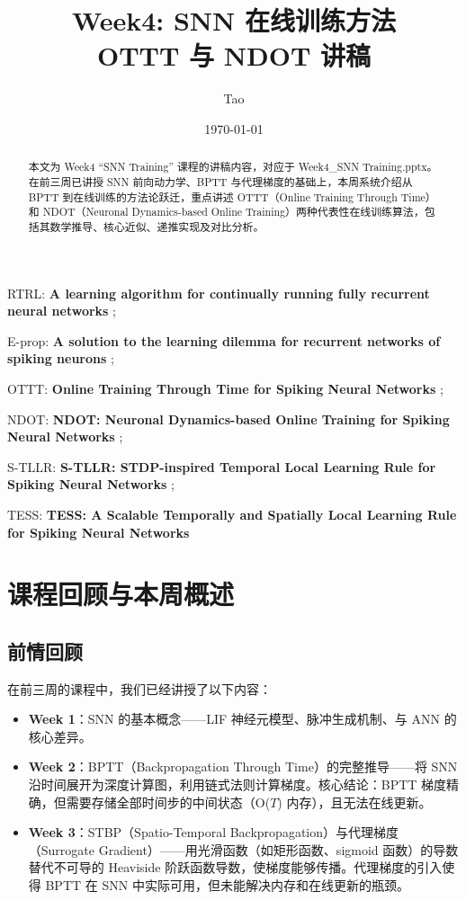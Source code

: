 \documentclass[journal,12pt,onecolumn]{IEEEtran}
\begin{document}
\title{Week4: SNN 在线训练方法\\OTTT 与 NDOT 讲稿}
\author{Tao}
\date{\today}
\maketitle

\begin{abstract}
本文为 Week4 ``SNN Training'' 课程的讲稿内容，对应于 Week4\_SNN Training.pptx。在前三周已讲授 SNN 前向动力学、BPTT 与代理梯度的基础上，本周系统介绍从 BPTT 到在线训练的方法论跃迁，重点讲述 OTTT（Online Training Through Time）和 NDOT（Neuronal Dynamics-based Online Training）两种代表性在线训练算法，包括其数学推导、核心近似、递推实现及对比分析。
\end{abstract}

RTRL: \textbf{A learning algorithm for continually running fully recurrent neural networks} \cite{williams1989learning};

E-prop: \textbf{A solution to the learning dilemma for recurrent networks of spiking neurons} \cite{bellec_solution_2020};

OTTT: \textbf{Online Training Through Time for Spiking Neural Networks} \cite{xiao_online_2022};

NDOT: \textbf{NDOT: Neuronal Dynamics-based Online Training for Spiking Neural Networks} \cite{jiang_ndot_nodate};

S-TLLR: \textbf{S-TLLR: STDP-inspired Temporal Local Learning Rule for Spiking Neural Networks} \cite{apolinario_s-tllr_2024};

TESS: \textbf{TESS: A Scalable Temporally and Spatially Local Learning Rule for Spiking Neural Networks} \cite{apolinario_tess_2025}

\section{课程回顾与本周概述}

\subsection*{前情回顾}

在前三周的课程中，我们已经讲授了以下内容：

\begin{itemize}
    \item \textbf{Week 1}：SNN 的基本概念——LIF 神经元模型、脉冲生成机制、与 ANN 的核心差异。
    \item \textbf{Week 2}：BPTT（Backpropagation Through Time）的完整推导——将 SNN 沿时间展开为深度计算图，利用链式法则计算梯度。核心结论：BPTT 梯度精确，但需要存储全部时间步的中间状态（O($T$) 内存），且无法在线更新。
    \item \textbf{Week 3}：STBP（Spatio-Temporal Backpropagation）与代理梯度（Surrogate Gradient）——用光滑函数（如矩形函数、sigmoid 函数）的导数替代不可导的 Heaviside 阶跃函数导数，使梯度能够传播。代理梯度的引入使得 BPTT 在 SNN 中实际可用，但未能解决内存和在线更新的瓶颈。
\end{itemize}
\end{document}
